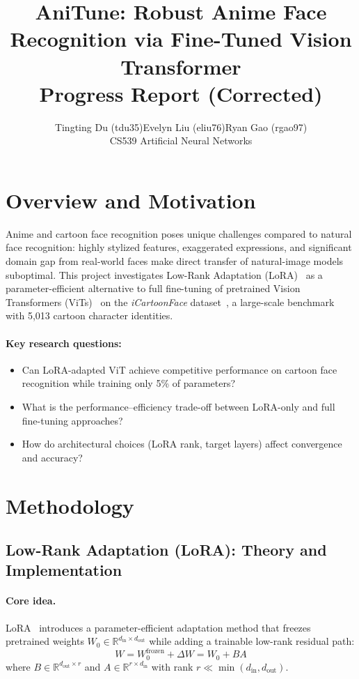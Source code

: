 \documentclass[11pt]{article}
\title{\vspace{-1.5em}\Large\textbf{AniTune: Robust Anime Face Recognition via Fine-Tuned Vision Transformer}\\[-0.25em]
\large Progress Report (Corrected)\vspace{-0.5em}}
\author{Tingting Du (tdu35)\quad Evelyn Liu (eliu76)\quad Ryan Gao (rgao97)\\[0.25em]
\small CS539 Artificial Neural Networks}
\date{}
\begin{document}
\maketitle

\section{Overview and Motivation}

Anime and cartoon face recognition poses unique challenges compared to natural face recognition: highly stylized features, exaggerated expressions, and significant domain gap from real-world faces make direct transfer of natural-image models suboptimal. This project investigates Low-Rank Adaptation (LoRA)~\cite{hu2021lora} as a parameter-efficient alternative to full fine-tuning of pretrained Vision Transformers (ViTs)~\cite{dosovitskiy2021vit} on the \emph{iCartoonFace} dataset~\cite{zheng2020icartoonface}, a large-scale benchmark with 5,013 cartoon character identities.

\paragraph{Key research questions:}
\begin{itemize}
    \item Can LoRA-adapted ViT achieve competitive performance on cartoon face recognition while training only 5\% of parameters?
    \item What is the performance--efficiency trade-off between LoRA-only and full fine-tuning approaches?
    \item How do architectural choices (LoRA rank, target layers) affect convergence and accuracy?
\end{itemize}

\section{Methodology}

\subsection{Low-Rank Adaptation (LoRA): Theory and Implementation}

\paragraph{Core idea.}
LoRA~\cite{hu2021lora} introduces a parameter-efficient adaptation method that freezes pretrained weights $W_0 \in \mathbb{R}^{d_{\text{in}} \times d_{\text{out}}}$ while adding a trainable low-rank residual path:
\begin{equation}
    W = W_0^{\text{frozen}} + \Delta W = W_0 + BA
\end{equation}
where $B \in \mathbb{R}^{d_{\text{out}} \times r}$ and $A \in \mathbb{R}^{r \times d_{\text{in}}}$ with rank $r \ll \min(d_{\text{in}}, d_{\text{out}})$.
\end{document}
